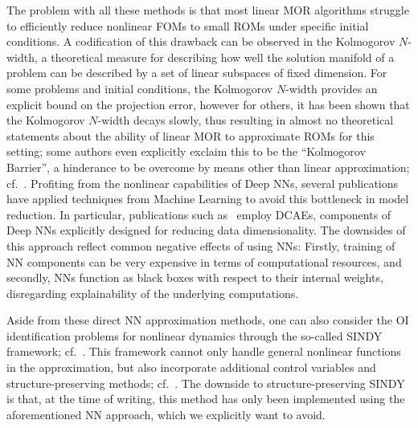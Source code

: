 The problem with all these methods is that most linear MOR algorithms struggle to efficiently reduce nonlinear \acp{FOM} to small \acp{ROM} under specific initial conditions.
A codification of this drawback can be observed in the Kolmogorov $N$-width, a theoretical measure for describing how well the solution manifold of a problem can be described by a set of linear subspaces of fixed dimension.
For some problems and initial conditions, the Kolmogorov $N$-width provides an explicit bound on the projection error, however for others, it has been shown that the Kolmogorov $N$-width decays slowly, thus resulting in almost no theoretical statements about the ability of linear \ac{MOR} to approximate \acp{ROM} for this setting; some authors even explicitly exclaim this to be the ``Kolmogorov Barrier'', a hinderance to be overcome by means other than linear approximation; cf.~\cite{Barnett2022}.
Profiting from the nonlinear capabilities of Deep \acfp{NN}, several publications have applied techniques from Machine Learning to avoid this bottleneck in model reduction.
In particular, publications such as~\cite{Lee2020, Benner2022, Romor2023, Buchfink2023} employ \acp{DCAE}, components of Deep \acp{NN} explicitly designed for reducing data dimensionality.
The downsides of this approach reflect common negative effects of using \acp{NN}: Firstly, training of \ac{NN} components can be very expensive in terms of computational resources, and secondly, \acp{NN} function as black boxes with respect to their internal weights, disregarding explainability of the underlying computations.

Aside from these direct \ac{NN} approximation methods, one can also consider the \ac{OI} identification problems for nonlinear dynamics through the so-called \acs{SINDY} framework; cf.~\cite{Brunton2016, Kaheman2020}.
This framework cannot only handle general nonlinear functions in the approximation, but also incorporate additional control variables and structure-preserving methods; cf.~\cite{Kaiser2018, Lee2022}.
The downside to structure-preserving \acs{SINDY} is that, at the time of writing, this method has only been implemented using the aforementioned \ac{NN} approach, which we explicitly want to avoid.


